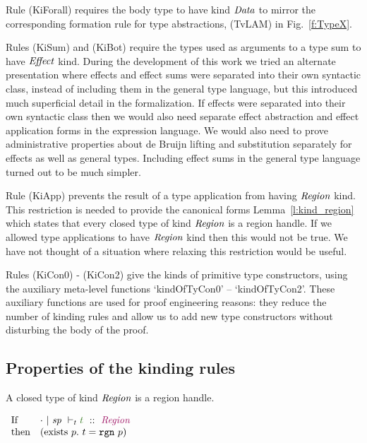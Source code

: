 Rule (KiForall) requires the body type to have kind $\mathit{Data}$ to mirror the corresponding formation rule for type abstractions, (TvLAM) in Fig.~\ref{f:TypeX}.

Rules (KiSum) and (KiBot) require the types used as arguments to a type sum to have $\mathit{Effect}$ kind. During the development of this work we tried an alternate presentation where effects and effect sums were separated into their own syntactic class, instead of including them in the general type language, but this introduced much superficial detail in the formalization. If effects were separated into their own syntactic class then we would also need separate effect abstraction and effect application forms in the expression language. We would also need to prove administrative properties about de Bruijn lifting and substitution separately for effects as well as general types. Including effect sums in the general type language turned out to be much simpler.

Rule (KiApp) prevents the result of a type application from having $\mathit{Region}$ kind. This restriction is needed to provide the canonical forms Lemma~\ref{l:kind_region} which states that every closed type of kind $\mathit{Region}$ is a region handle. If we allowed type applications to have $\mathit{Region}$ kind then this would not be true. We have not thought of a situation where relaxing this restriction would be useful.

Rules (KiCon0) - (KiCon2) give the kinds of primitive type constructors, using the auxiliary meta-level functions `kindOfTyCon0' -- `kindOfTyCon2'. These auxiliary functions are used for proof engineering reasons: they reduce the number of kinding rules and allow us to add new type constructors without disturbing the body of the proof.


\subsection{Properties of the kinding rules}

%
\begin{lemma}
\label{l:kind_region}
A closed type of kind $\mathit{Region}$ is a region handle.
\end{lemma}
$
\begin{array}{ll}
        \pIf    & \KindT{\nil}{\msp}{t}{\kcRegion}
\\      \pthen  & (\pexists~ p.~ t = \trgn{p})
\end{array}
$

